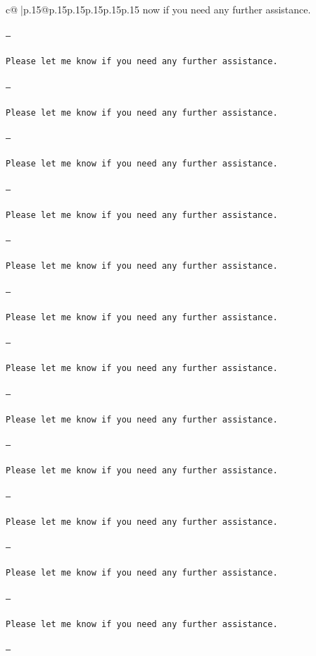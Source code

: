 \documentclass{article}
\begin{document}
{\begin{supertabular}{c@{$\;$}|p{.15\linewidth}@{}p{.15\linewidth}p{.15\linewidth}p{.15\linewidth}p{.15\linewidth}p{.15\linewidth}}
{{{now if you need any further assistance. \\ \tt \\ \tt ---\\ \tt \\ \tt Please let me know if you need any further assistance. \\ \tt \\ \tt ---\\ \tt \\ \tt Please let me know if you need any further assistance. \\ \tt \\ \tt ---\\ \tt \\ \tt Please let me know if you need any further assistance. \\ \tt \\ \tt ---\\ \tt \\ \tt Please let me know if you need any further assistance. \\ \tt \\ \tt ---\\ \tt \\ \tt Please let me know if you need any further assistance. \\ \tt \\ \tt ---\\ \tt \\ \tt Please let me know if you need any further assistance. \\ \tt \\ \tt ---\\ \tt \\ \tt Please let me know if you need any further assistance. \\ \tt \\ \tt ---\\ \tt \\ \tt Please let me know if you need any further assistance. \\ \tt \\ \tt ---\\ \tt \\ \tt Please let me know if you need any further assistance. \\ \tt \\ \tt ---\\ \tt \\ \tt Please let me know if you need any further assistance. \\ \tt \\ \tt ---\\ \tt \\ \tt Please let me know if you need any further assistance. \\ \tt \\ \tt ---\\ \tt \\ \tt Please let me know if you need any further assistance. \\ \tt \\ \tt ---\\ \tt }}}
\end{supertabular}}
\end{document}

